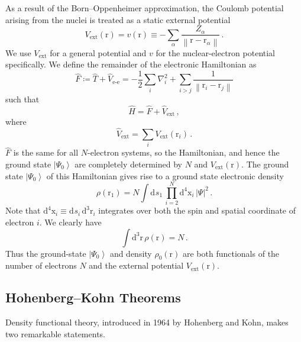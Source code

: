 \documentclass{article}
\theoremstyle{plain}\theoremheaderfont{\normalfont\itshape}\theorembodyfont{\rmfamily}\theoremseparator{.}\newtheorem*{rem}{Remark}\newtheorem*{ex}{Example}\newtheorem*{proof}{Proof}\newtheorem*{altp}{Alternative proof}
\theoremstyle{plain}\theoremheaderfont{\normalfont\bfseries}\theorembodyfont{\rmfamily}\theoremseparator{.}\newtheorem{thm}{Theorem}[section]\newtheorem{lem}[thm]{Lemma}\newtheorem{prop}[thm]{Proposition}\newtheorem*{cor}{Corollary}\newtheorem{defn}[thm]{Definition}\newtheorem{clm}[thm]{Claim}\newtheorem{clminproof}{Claim}
\theoremstyle{break}\theoremheaderfont{\normalfont\itshape}\theorembodyfont{\rmfamily}\theoremseparator{.\medskip}\newtheorem*{proofskip}{Proof}\newtheorem*{exs}{Examples}\newtheorem*{rems}{Remarks}
\theoremstyle{break}\theoremheaderfont{\normalfont\bfseries}\theorembodyfont{\rmfamily}\theoremseparator{.\medskip}\newtheorem{lemskip}[thm]{Lemma}\newtheorem{defnskip}[thm]{Definition}\newtheorem{propskip}[thm]{Proposition}\newtheorem{thmskip}[thm]{Theorem}
\numberwithin{equation}{section}
\newcommand{\dd}[2][]{\mathrm{d}^{#1} #2\,}
\renewcommand{\d}[2][]{\mathrm{d}^{#1} #2}
\newcommand{\ket}[1]{\left| #1 \right\rangle}
\newcommand{\vb}[1]{\bm{\mathrm{#1}}}
\newcommand{\abs}[1]{\left| #1 \right|}
\newcommand{\norm}[1]{\left\| #1 \right\|}
\newcommand{\laplacian}{\nabla^2}
\newcommand{\ext}{_{\text{ext}}}
\newcommand{\ee}{_{\text{e-e}}}
\begin{document}
    As a result of the Born--Oppenheimer approximation, the Coulomb potential arising from the nuclei is treated as a static external potential
    \begin{equation}
        V\ext(\vb{r})=v(\vb{r})\equiv -\sum_{\alpha}\frac{Z_{\alpha}}{\norm{\vb{r}-\vb{r}_{\alpha}}}\,.
    \end{equation}
    We use \(V\ext\) for a general potential and \(v\) for the nuclear-electron potential specifically. We define the remainder of the electronic Hamiltonian as
    \begin{equation}
        \hat{F}\coloneqq\hat{T}+\hat{V}\ee=-\frac{1}{2}\sum_i\laplacian_i+\sum_{i>j}\frac{1}{\norm{\vb{r}_i-\vb{r}_j}}
    \end{equation}
    such that
    \begin{equation}
        \hat{H}=\hat{F}+\hat{V}\ext\,,
    \end{equation}
    where
    \begin{equation}
        \hat{V}\ext=\sum_i V\ext(\vb{r}_i)\,.
    \end{equation}
    \(\hat{F}\) is the same for all \(N\)-electron systems, so the Hamiltonian, and hence the ground state \(\ket{\Psi_0}\) are completely determined by \(N\) and \(V\ext(\vb{r})\). The ground state \(\ket{\Psi_0}\) of this Hamiltonian gives rise to a ground state electronic density
    \begin{equation}
        \rho(\vb{r}_1)=N\int\dd{s_1}\prod_{i=2}^{N}\dd[4]{\vb{x}_i}\abs{\Psi}^2\,.
    \end{equation}
    Note that \(\d[4]{\vb{x}_i}\equiv\dd{s_i}\d[3]{\vb{r}_i}\) integrates over both the spin and spatial coordinate of electron \(i\). We clearly have
    \begin{equation}\label{total_electron_density}
        \int\dd[3]{\vb{r}}\rho(\vb{r})=N\,.
    \end{equation}
    Thus the ground-state \(\ket{\Psi_0}\) and density \(\rho_0(\vb{r})\) are both functionals of the number of electrons \(N\) and the external potential \(V\ext(\vb{r})\).

    \subsection{Hohenberg--Kohn Theorems}
    Density functional theory, introduced in 1964 by Hohenberg and Kohn, makes two remarkable statements.
    
\end{document}
